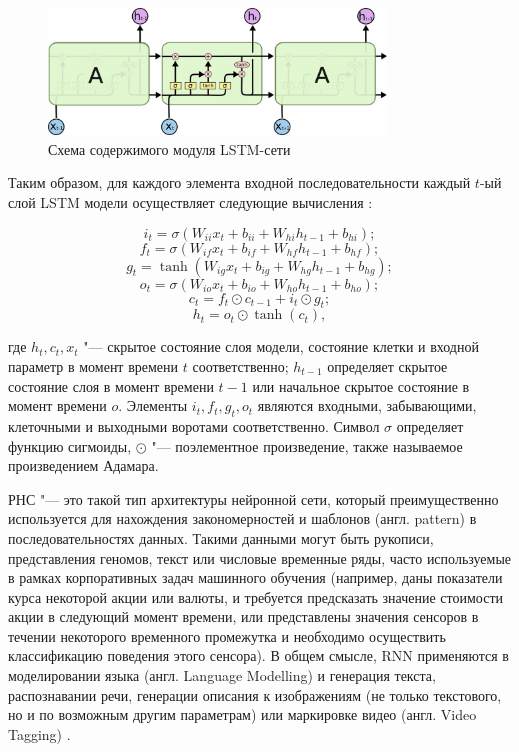 \documentclass[bachelor, och, coursework]{SCWorks}
\begin{document}
        \begin{figure}[H]
            \centering
            \includegraphics[width=0.8\textwidth]{pics/lstm.png}
            \caption{Схема содержимого модуля LSTM-сети \cite{lstm2}}
        \end{figure}

        Таким образом, для каждого элемента входной последовательности каждый
        $t$-ый слой LSTM модели осуществляет следующие вычисления
        \cite{torchlstm}:

        \[i_t = \sigma(W_{ii} x_t + b_{ii} + W_{hi} h_{t - 1} + b_{hi}) ;\]
        \[f_t = \sigma(W_{if} x_t + b_{if} + W_{hf} h_{t - 1} + b_{hf}) ;\]
        \[g_t = \tanh(W_{ig} x_t + b_{ig} + W_{hg} h_{t - 1} + b_{hg}) ;\]
        \[o_t = \sigma(W_{io} x_t + b_{io} + W_{ho} h_{t - 1} + b_{ho}) ;\]
        \[c_t = f_t \odot c_{t - 1} + i_t \odot g_t ;\]
        \[h_t = o_t \odot \tanh(c_t) ,\]

        где $h_t, c_t, x_t$ "--- скрытое состояние слоя модели, состояние клетки
        и входной параметр в момент времени $t$ соответственно; $h_{t - 1}$
        определяет скрытое состояние слоя в момент времени $t - 1$ или начальное
        скрытое состояние в момент времени $o$. Элементы $i_t, f_t, g_t, o_t$
        являются входными, забывающими, клеточными и выходными воротами
        соответственно. Символ $\sigma$ определяет функцию сигмоиды, $\odot$
        "--- поэлементное произведение, также называемое произведением Адамара.

        РНС "--- это такой тип архитектуры нейронной сети, который
        преимущественно используется для нахождения закономерностей и шаблонов
        (англ. pattern) в последовательностях данных. Такими данными могут быть
        рукописи, представления геномов, текст или числовые временные ряды,
        часто используемые в рамках корпоративных задач машинного обучения
        (например, даны показатели курса некоторой акции или валюты, и требуется
        предсказать значение стоимости акции в следующий момент времени, или
        представлены значения сенсоров в течении некоторого временного
        промежутка и необходимо осуществить классификацию поведения этого
        сенсора). В общем смысле, RNN применяются в моделировании языка (англ.
        Language Modelling) и генерация текста, распознавании речи, генерации
        описания к изображениям (не только текстового, но и по возможным другим
        параметрам) или маркировке видео (англ. Video Tagging) \cite{rnn2}.
        
\end{document}
